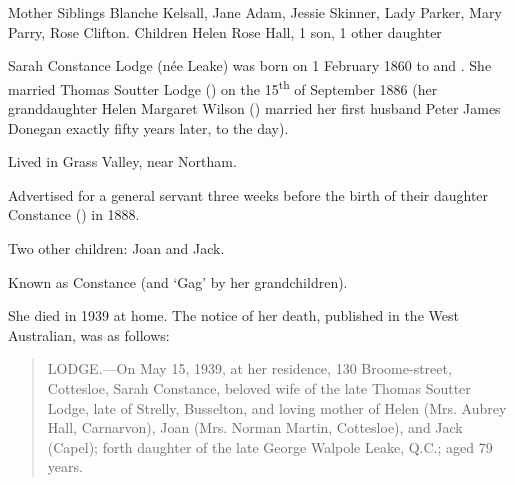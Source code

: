 
Mother
Siblings 	Blanche Kelsall, Jane Adam, Jessie Skinner, Lady Parker, Mary Parry, Rose Clifton.
Children 	Helen Rose Hall, 1 son, 1 other daughter

Sarah Constance Lodge (n\'{e}e Leake) was born on 1 February 1860 to  and .
She married Thomas Soutter Lodge () on the 15\textsuperscript{th} of September 1886
(her granddaughter Helen Margaret Wilson () married her first husband Peter James Donegan exactly fifty years later, to the day\cite{HMWnote}).

Lived in Grass Valley, near Northam.\cite{ServantAd}

Advertised for a general servant three weeks before the birth of their daughter Constance () in 1888.\cite{ServantAd}

Two other children: Joan and Jack.\cite{SCLdeathNotice}

Known as Constance (and `Gag' by her grandchildren).

She died in 1939 at home.
The notice of her death, published in the West Australian, was as follows:\cite{SCLdeathNotice}

\begin{quotation}
LODGE.---On May 15, 1939, at her residence, 130 Broome-street, Cottesloe, Sarah Constance, beloved wife of the late Thomas Soutter Lodge, late of Strelly, Busselton, and loving mother of Helen (Mrs. Aubrey Hall, Carnarvon), Joan (Mrs. Norman Martin, Cottesloe), and Jack (Capel); forth daughter of the late George Walpole Leake, Q.C.; aged 79 years.
\end{quotation}
